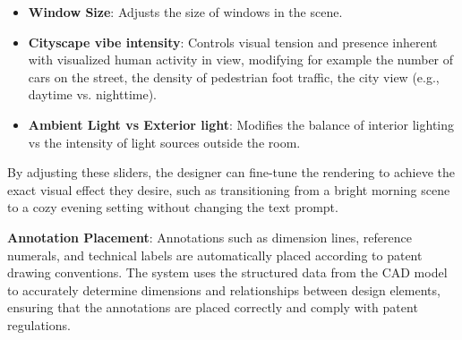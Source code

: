 \documentclass[12pt]{report}
\begin{document}
\begin{itemize}
    \item \textbf{Window Size}: Adjusts the size of windows in the scene.
    \item \textbf{Cityscape vibe intensity}: Controls visual tension and presence inherent with visualized human activity in view, modifying for example the number of cars on the street, the density of pedestrian foot traffic, the city view (e.g., daytime vs. nighttime).
    \item \textbf{Ambient Light vs Exterior light}: Modifies the balance of interior lighting vs the intensity of light sources outside the room.

\end{itemize}

By adjusting these sliders, the designer can fine-tune the rendering to achieve the exact visual effect they desire, such as transitioning from a bright morning scene to a cozy evening setting without changing the text prompt.





\item \textbf{Annotation Placement}: Annotations such as dimension lines, reference numerals, and technical labels are automatically placed according to patent drawing conventions. The system uses the structured data from the CAD model to accurately determine dimensions and relationships between design elements, ensuring that the annotations are placed correctly and comply with patent regulations.
\end{document}
